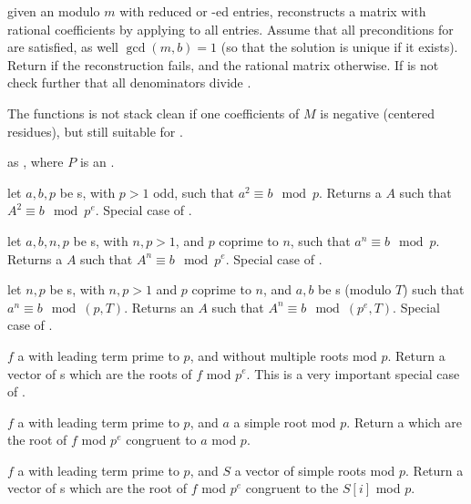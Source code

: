 given an  modulo $m$ with reduced or -ed entries,
reconstructs a matrix with rational coefficients by applying 
to all entries. Assume that all preconditions for  are
satisfied, as well $\gcd(m,b) = 1$ (so that the solution is unique if it
exists). Return  if the reconstruction fails, and the rational
matrix otherwise. If  is not  check further that all
denominators divide .

The functions is not stack clean if one coefficients of $M$ is negative
(centered residues), but still suitable for .

 as
, where $P$ is an .


 let
$a,b,p$ be s, with $p > 1$ odd, such that $a^2\equiv b\mod p$.
Returns a  $A$ such that $A^2 \equiv b \mod p^e$. Special case
of .

 let
$a,b,n,p$ be s, with $n,p > 1$, and $p$ coprime to $n$,
such that $a^n \equiv b \mod p$. Returns a  $A$ such that
$A^n \equiv b \mod p^e$. Special case of .

 let
$n,p$ be s, with $n,p > 1$ and $p$ coprime to $n$, and $a,b$
be s (modulo $T$) such that $a^n \equiv b \mod (p,T)$.
Returns an  $A$ such that $A^n \equiv b \mod (p^e, T)$.
Special case of .

 $f$ a  with leading
term prime to $p$, and without multiple roots mod $p$. Return a vector
of s which are the roots of $f$ mod $p^e$. This is a very important
special case of .

 $f$ a  with
leading term prime to $p$, and $a$ a simple root mod $p$. Return a 
which are the root of $f$ mod $p^e$ congruent to $a$ mod $p$.

 $f$ a  with
leading term prime to $p$, and $S$ a vector of simple roots mod $p$. Return a
vector of s which are the root of $f$ mod $p^e$ congruent to the
$S[i]$ mod $p$.

